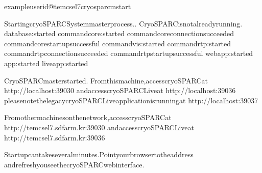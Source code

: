 \documentclass[a4paper,10pt,english]{sphinxmanual}
\begin{document}
\begin{sphinxVerbatim}[commandchars=\\\{\}]
exampleuserid@tem\PYGZhy{}cs\PYGZhy{}el7\PYGZdl{}\PYGZgt{}cryosparcmstart

StartingcryoSPARCSystemmasterprocess..
CryoSPARCisnotalreadyrunning.
database:started
command\PYGZus{}core:started
command\PYGZus{}coreconnectionsucceeded
command\PYGZus{}corestartupsuccessful
command\PYGZus{}vis:started
command\PYGZus{}rtp:started
command\PYGZus{}rtpconnectionsucceeded
command\PYGZus{}rtpstartupsuccessful
webapp:started
app:started
liveapp:started
\PYGZhy{}\PYGZhy{}\PYGZhy{}\PYGZhy{}\PYGZhy{}\PYGZhy{}\PYGZhy{}\PYGZhy{}\PYGZhy{}\PYGZhy{}\PYGZhy{}\PYGZhy{}\PYGZhy{}\PYGZhy{}\PYGZhy{}\PYGZhy{}\PYGZhy{}\PYGZhy{}\PYGZhy{}\PYGZhy{}\PYGZhy{}\PYGZhy{}\PYGZhy{}\PYGZhy{}\PYGZhy{}\PYGZhy{}\PYGZhy{}\PYGZhy{}\PYGZhy{}\PYGZhy{}\PYGZhy{}\PYGZhy{}\PYGZhy{}\PYGZhy{}\PYGZhy{}\PYGZhy{}\PYGZhy{}\PYGZhy{}\PYGZhy{}\PYGZhy{}\PYGZhy{}\PYGZhy{}\PYGZhy{}\PYGZhy{}\PYGZhy{}\PYGZhy{}\PYGZhy{}\PYGZhy{}\PYGZhy{}\PYGZhy{}\PYGZhy{}\PYGZhy{}\PYGZhy{}

CryoSPARCmasterstarted.
Fromthismachine,accesscryoSPARCat
http://localhost:39030
andaccesscryoSPARCLiveat
http://localhost:39036
pleasenotethelegacycryoSPARCLiveapplicationisrunningat
http://localhost:39037

Fromothermachinesonthenetwork,accesscryoSPARCat
http://tem\PYGZhy{}cs\PYGZhy{}el7.sdfarm.kr:39030
andaccesscryoSPARCLiveat
http://tem\PYGZhy{}cs\PYGZhy{}el7.sdfarm.kr:39036


Startupcantakeseveralminutes.Pointyourbrowsertotheaddress
andrefreshyouseethecryoSPARCwebinterface.
\end{sphinxVerbatim}
\end{document}
